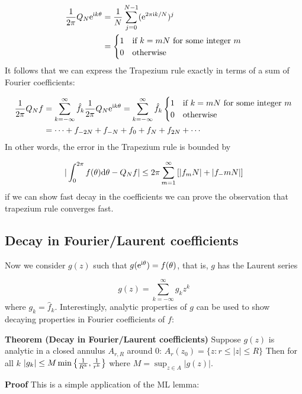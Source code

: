 \documentclass[12pt,a4paper]{article}
\def\D{ {\rm d} }
\def\I{ {\rm i} }
\def\E{ {\rm e} }
\def\br[#1]{\left[{#1}\right]}
\begin{document}
\begin{align*}
{1 \over 2 \pi} Q_N \E^{\I k \theta} &= {1 \over N} \sum_{j=0}^{N-1} (\E^{2 \pi \I k /N})^j \\
    &= \begin{cases}
        1 & \hbox{if $k = m N$ for some integer $m$} \\
        0 & \hbox{otherwise}
    \end{cases}
\end{align*}
It follows that we can express the Trapezium rule exactly in terms of a sum of Fourier coefficients:


\begin{align*}
{1 \over 2 \pi} Q_N f &= \sum_{k=-\infty}^\infty \hat f_k {1 \over 2 \pi} Q_N \E^{\I k \theta} = \sum_{k=-\infty}^\infty \hat f_k \begin{cases}
        1 & \hbox{if $k = m N$ for some integer $m$} \\
        0 & \hbox{otherwise}
    \end{cases} \\
    &= \cdots + f_{-2N} + f_{-N} + f_0 + f_N + f_{2N} + \cdots
\end{align*}
In other words, the error in the Trapezium rule is bounded by

\[
|\int_0^{2\pi} f(\theta) \D \theta - Q_N f| \leq 2 \pi \sum_{m=1}^\infty \br[|f_{m N}| + |f_{-m N}|]
\]
if we can show fast decay in the coefficients we can prove the observation that trapezium rule converges fast. 

\subsection{Decay in Fourier/Laurent coefficients}
Now we consider $g(z)$ such that $g(\E^{\I \theta}) = f(\theta)$, that is, $g$ has the Laurent series

\[
g(z) = \sum_{k=-\infty}^\infty g_k z^k
\]
where $g_k = \hat f_k$.  Interestingly, analytic properties of $g$ can be used to show decaying properties in Fourier coefficients of $f$:

\textbf{Theorem (Decay in Fourier/Laurent coefficients)} Suppose $g(z)$ is analytic in a closed annulus $A_{r,R}$ around $0$: $A_r(z_0) = \{z : r \ensuremath{\le} | z| \ensuremath{\le} R\}$ Then for all $k$ $|g_k | \leq M\min\left\{{1 \over R^k} , {1 \over r^k}\right\}$ where $M = \sup_{z \in  A} |g(z)|$.

\textbf{Proof} This is a simple application of the ML lemma: 
\end{document}
